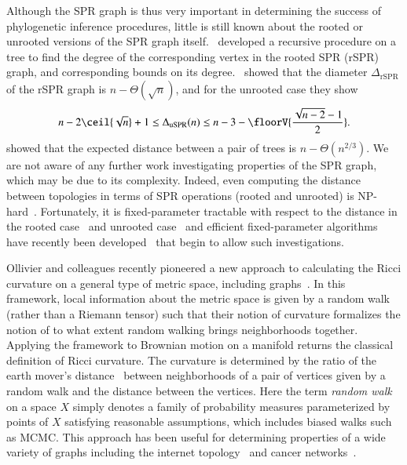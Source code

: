 \documentclass[]{elsarticle}
\begin{document}
Although the SPR graph is thus very important in determining the success of phylogenetic inference procedures, little is still known about the rooted or unrooted versions of the SPR graph itself.
\citep{Song2003-gf}~developed a recursive procedure on a tree to find the degree of the corresponding vertex in the rooted SPR (rSPR) graph, and corresponding bounds on its degree.
\citep{Ding2011-bj}~showed that the diameter $\Delta_{\text{rSPR}}$ of the rSPR graph is $n - \Theta(\sqrt n)$, and for the unrooted case they show
\begin{equation}
n - 2\ceil{\sqrt{n}} + 1
\le \Delta_{\text{uSPR}}(n)
\le n - 3 - \floorV{\frac{\sqrt{n - 2} - 1}{2}}.
\end{equation}
\citep{atkins2015extremal} showed that the expected distance between a pair of trees is $n - \Theta(n^{2/3})$.
We are not aware of any further work investigating properties of the SPR graph, which may be due to its complexity.
Indeed, even computing the distance between topologies in terms of SPR operations (rooted and unrooted) is NP-hard~\citep{bordewich05,hickey2008sdc}.
Fortunately, it is fixed-parameter tractable with respect to the distance in the rooted case~\citep{bordewich05} and unrooted case~\citep{bonet2010complexity} and efficient fixed-parameter algorithms have recently been developed~\citep{Whidden2015-yi,whidden2013hybridization,whidden2016calculating} that begin to allow such investigations.

Ollivier and colleagues recently pioneered a new approach to calculating the Ricci curvature on a general type of metric space, including graphs~\citep{Ollivier2009-bw,Joulin2010-jg}.
In this framework, local information about the metric space is given by a random walk (rather than a Riemann tensor) such that their notion of curvature formalizes the notion of to what extent random walking brings neighborhoods together.
Applying the framework to Brownian motion on a manifold returns the classical definition of Ricci curvature.
The curvature is determined by the ratio of the earth mover's distance~\citep{rubner2000earth} between neighborhoods of a pair of vertices given by a random walk and the distance between the vertices.
Here the term \emph{random walk} on a space $X$ simply denotes a family of probability measures parameterized by points of $X$ satisfying reasonable assumptions, which includes biased walks such as MCMC.
This approach has been useful for determining properties of a wide variety of graphs including the internet topology~\citep{ni2015ricci} and cancer networks~\citep{sandhu2015graph}.
\end{document}

